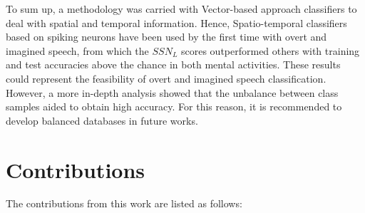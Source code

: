 To sum up, a methodology was carried with Vector-based approach classifiers to deal with spatial and temporal information. Hence, Spatio-temporal classifiers based on spiking neurons have been used by the first time with overt and imagined speech, from which the $SSN_{L}$ scores outperformed others with training and test accuracies above the chance in both mental activities. These results could represent the feasibility of overt and imagined speech classification. However, a more in-depth analysis showed that the unbalance between class samples aided to obtain high accuracy. For this reason, it is recommended to develop balanced databases in future works.

\section{Contributions}
The contributions from this work are listed as follows:
